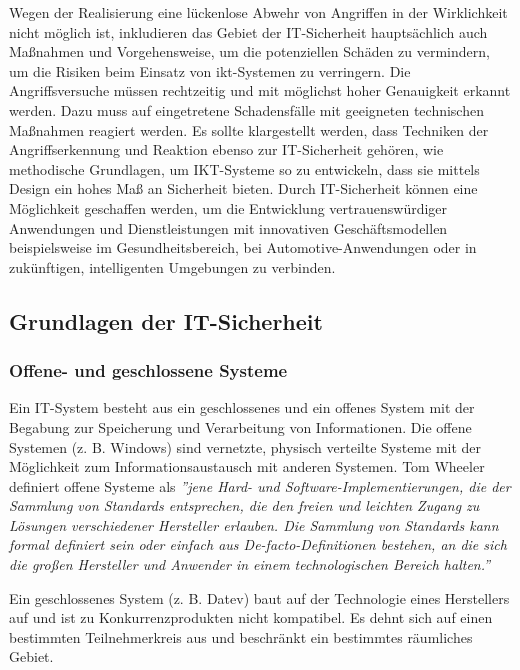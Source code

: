 Wegen der Realisierung eine lückenlose Abwehr von Angriffen in der Wirklichkeit nicht möglich ist, inkludieren das Gebiet der IT-Sicherheit hauptsächlich auch Maßnahmen und Vorgehensweise, um die potenziellen Schäden zu vermindern, um die Risiken beim Einsatz von \gls{ikt}-Systemen zu verringern. Die Angriffsversuche müssen rechtzeitig und mit möglichst hoher Genauigkeit erkannt werden. Dazu muss auf eingetretene Schadensfälle mit geeigneten technischen Maßnahmen reagiert werden. Es sollte klargestellt werden, dass Techniken der Angriffserkennung und Reaktion ebenso zur IT-Sicherheit gehören, wie methodische Grundlagen, um IKT-Systeme so zu entwickeln, dass sie mittels Design ein hohes Maß an Sicherheit bieten. Durch IT-Sicherheit können eine Möglichkeit geschaffen werden, um die Entwicklung vertrauenswürdiger Anwendungen und Dienstleistungen mit innovativen Geschäftsmodellen beispielsweise im Gesundheitsbereich, bei Automotive-Anwendungen oder in zukünftigen, intelligenten Umgebungen zu verbinden\cite[20--21]{eckert2013sicherheit}.

\subsection{Grundlagen der IT-Sicherheit}

\subsubsection{Offene- und geschlossene Systeme}

Ein IT-System besteht aus ein geschlossenes und ein offenes System mit der Begabung zur Speicherung und Verarbeitung von Informationen. Die offene Systemen (z. B. Windows) sind vernetzte, physisch verteilte Systeme mit der Möglichkeit zum Informationsaustausch mit anderen Systemen\cite[22--23]{eckert2013sicherheit}. Tom Wheeler definiert offene Systeme als \emph{''jene Hard- und Software-Implementierungen, die der Sammlung von Standards entsprechen, die den freien und leichten Zugang zu Lösungen verschiedener Hersteller erlauben. Die Sammlung von Standards kann formal definiert sein oder einfach aus De-facto-Definitionen bestehen, an die sich die großen Hersteller und Anwender in einem technologischen Bereich halten.''}\cite[4]{wheeler2013offene} 

Ein geschlossenes System (z. B. Datev) baut auf der Technologie eines Herstellers auf und ist zu Konkurrenzprodukten nicht kompatibel.  Es dehnt sich auf einen bestimmten Teilnehmerkreis aus und beschränkt ein bestimmtes räumliches Gebiet\cite[22--23]{eckert2013sicherheit}.

